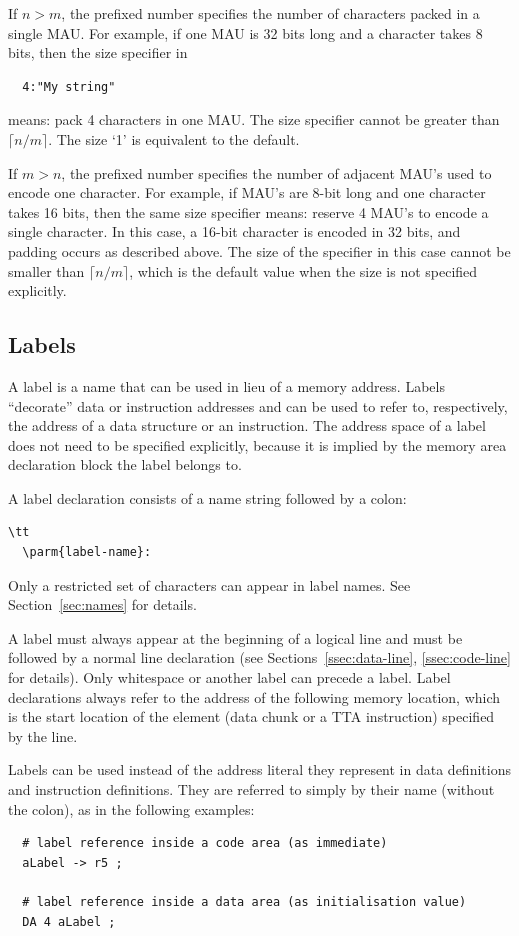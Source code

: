 \documentclass[twoside]{tceusermanual}
\begin{document}
If $n > m$, the prefixed number specifies the number of characters packed in
a single MAU. For example, if one MAU is 32 bits long and a character takes
8 bits, then the size specifier in
\begin{verbatim}
  4:"My string"
\end{verbatim}
means: pack 4 characters in one MAU. The size specifier cannot be greater
than $\lceil n/m \rceil$. The size `1' is equivalent to the default.

If $m > n$, the prefixed number specifies the number of adjacent MAU's used
to encode one character. For example, if MAU's are 8-bit long and one
character takes 16 bits, then the same size specifier means: reserve 4 MAU's
to encode a single character. In this case, a 16-bit character is encoded in
32 bits, and padding occurs as described above. The size of the specifier in
this case cannot be smaller than $\lceil n/m \rceil$, which is the default
value when the size is not specified explicitly.

\subsection{Labels}
\label{ssec:labels}

A label is a name that can be used in lieu of a memory address.  Labels
``decorate'' data or instruction addresses and can be used to refer to,
respectively, the address of a data structure or an instruction.
%
The address space of a label does not need to be specified explicitly,
because it is implied by the memory area declaration block the label belongs
to.

A label declaration consists of a name string followed by a colon:

\begin{verbatim}\tt
  \parm{label-name}:
\end{verbatim}

Only a restricted set of characters can appear in label names. See
Section~\ref{sec:names} for details.

A label must always appear at the beginning of a logical line and must be
followed by a normal line declaration (see Sections~\ref{ssec:data-line},
\ref{ssec:code-line} for details). Only whitespace or another label can
precede a label. Label declarations always refer to the address of the
following memory location, which is the start location of the element (data
chunk or a TTA instruction) specified by the line.

Labels can be used instead of the address literal they represent in data
definitions and instruction definitions. They are referred to simply by
their name (without the colon), as in the following examples:
\begin{verbatim}
  # label reference inside a code area (as immediate)
  aLabel -> r5 ;

  # label reference inside a data area (as initialisation value)
  DA 4 aLabel ;
\end{verbatim}
\end{document}

